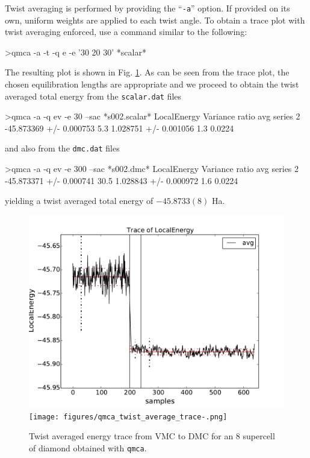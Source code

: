 Twist averaging is performed by providing the ``\texttt{-a}'' 
option.  If provided on its own, uniform weights are applied 
to each twist angle.  To obtain a trace plot with twist averaging 
enforced, use a command similar to the following:
\begin{shade}
>qmca -a -t -q e -e '30 20 30' *scalar*
\end{shade}
\noindent
The resulting plot is shown in Fig. \ref{fig:qmca_twist_average}.
As can be seen from the trace plot, the chosen equilibration lengths 
are appropriate and we proceed to obtain the twist averaged total energy
from the \texttt{scalar.dat} files
\begin{shade}
>qmca -a -q ev -e 30 --sac *s002.scalar*
                            LocalEnergy               Variance           ratio 
avg  series 2  -45.873369 +/- 0.000753    5.3   1.028751 +/- 0.001056    1.3   0.0224 
\end{shade}
\noindent
and also from the \texttt{dmc.dat} files
\begin{shade}
>qmca -a -q ev -e 300 --sac *s002.dmc*
                            LocalEnergy               Variance           ratio 
avg  series 2  -45.873371 +/- 0.000741   30.5   1.028843 +/- 0.000972    1.6   0.0224 
\end{shade}
\noindent
yielding a twist averaged total energy of $-45.8733(8)$ Ha. 

\begin{figure}
\begin{center}
\ifpdf
\includegraphics[trim = 0mm 0mm 0mm 0mm, clip,width=0.75\columnwidth]{figures/qmca_twist_average_trace.pdf}
\else
\texttt{[image: figures/qmca\_twist\_average\_trace-.png]}
\fi
\end{center}
\caption{Twist averaged energy trace from VMC to DMC for an 8 supercell of diamond obtained with \texttt{qmca}.}
\label{fig:qmca_twist_average}
\end{figure}

